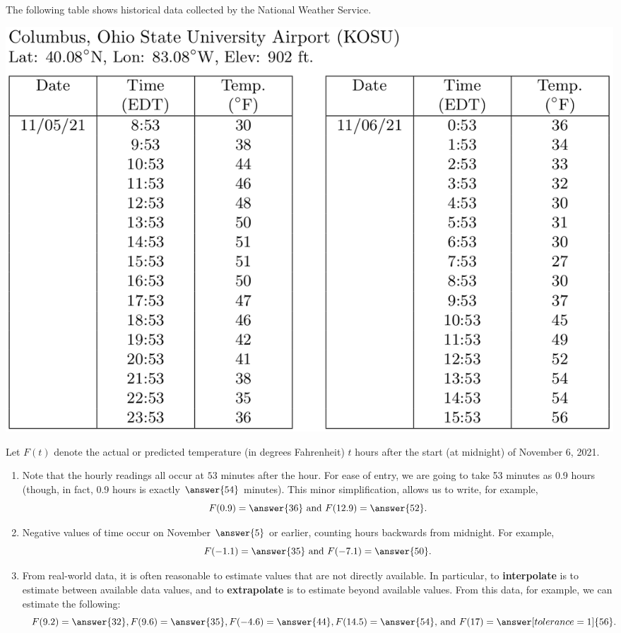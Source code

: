 \documentclass[nooutcomes]{ximera}
\begin{document}
%
%
%


\begin{problem}
The following table shows historical data collected by the National Weather Service.  
\begin{image}
\includegraphics[scale=0.5]{columbusTemp1106.png}
\end{image}
Let $F(t)$ denote the actual or predicted temperature (in degrees Fahrenheit) $t$ hours after the start (at midnight) of November 6, 2021.  

\begin{enumerate}
\item Note that the hourly readings all occur at $53$ minutes after the hour.  For ease of entry, we are going to take 53 minutes as 0.9 hours (though, in fact, 0.9 hours is exactly $\answer{54}$ minutes).  This minor simplification, allows us to write, for example, 
\[
F(0.9) = \answer{36}\text{ and }F(12.9)=\answer{52}.  
\]
\item Negative values of time occur on November $\answer{5}$ or earlier, counting hours backwards from midnight.  For example, 
\[
F(-1.1) = \answer{35}\text{ and }F(-7.1)=\answer{50}.  
\]
\item From real-world data, it is often reasonable to estimate values that are not directly available.  In particular, to \textbf{interpolate} is to estimate between available data values, and to \textbf{extrapolate} is to estimate beyond available values. From this data, for example, we can estimate the following:  
\[
F(9.2)=\answer{32}, F(9.6)=\answer{35}, F(-4.6)=\answer{44}, F(14.5)=\answer{54}\text{, and }F(17)=\answer[tolerance=1]{56}.  
\]
\end{enumerate}


\end{problem}
\end{document}
